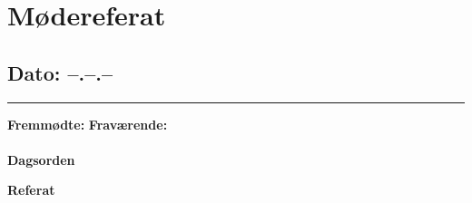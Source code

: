 \chapter{Mødereferat}

\section{Dato: --.--.--}
\hrule

\textbf{Fremmødte:} 
\textbf{Fraværende:} 
\\
\\
\textbf{Dagsorden}

\textbf{Referat} 
\\
